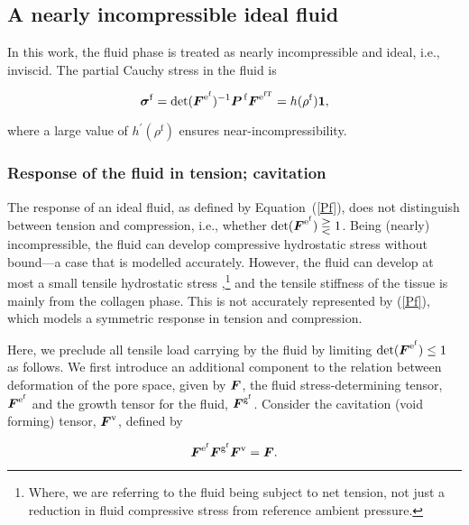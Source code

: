 \subsection{A nearly incompressible ideal fluid}
\label{ideal-incompressible-fluid}

In this work, the fluid phase is treated as nearly incompressible and
ideal, i.e., inviscid. The partial Cauchy stress in the fluid is

\begin{equation}
\mbox{\boldmath$\sigma$}^\mathrm{f} = \mathrm{det}(\mbox{\boldmath$ F$}^{\mathrm{e}^\mathrm{f}})^{-1}
\mbox{\boldmath$ P$}^{\,\mathrm{f}}\mbox{\boldmath$ F$}^{\mathrm{e}^\mathrm{fT}} =
h(\rho^\mathrm{f}){\bf 1},\label{Pf}
\end{equation}

\noindent where a large value of $h^\prime(\rho^\mathrm{f})$ ensures
near-in\-comp\-ress\-i\-bil\-i\-ty.

\subsubsection{Response of the fluid in tension; cavitation}
\label{caviation-under-tension}

The response of an ideal fluid, as defined by \mbox{Equation
  (\ref{Pf})}, does not distinguish between tension and compression,
i.e., whether $\mathrm{det}(\mbox{\boldmath$ F$}^{\mathrm{e}^\mathrm{f}}) \gtreqless
1$. Being (nearly) incompressible, the fluid can develop compressive
hydrostatic stress without bound---a case that is modelled
accurately. However, the fluid can develop at most a small tensile
hydrostatic stress \citep{cavitationchris},\footnote{Where, we are
  referring to the fluid being subject to net tension, not just a
  reduction in fluid compressive stress from reference ambient
  pressure.} and the tensile stiffness of the tissue is mainly from
the collagen phase. This is not accurately represented by (\ref{Pf}),
which models a symmetric response in tension and compression.

Here, we preclude all tensile load carrying by the fluid by limiting
\mbox{$\mathrm{det}(\mbox{\boldmath$ F$}^{\mathrm{e}^\mathrm{f}}) \leq 1$} as
follows. We first introduce an additional component to the relation
between deformation of the pore space, given by $\mbox{\boldmath$ F$}$, the fluid
stress-determining tensor, $\mbox{\boldmath$ F$}^{\mathrm{e}^\mathrm{f}}$ and the
growth tensor for the fluid, $\mbox{\boldmath$ F$}^{\mathrm{g}^\mathrm{f}}$. Consider
the cavitation (void forming) tensor, $\mbox{\boldmath$ F$}^{\mathrm{v}}$, defined by
  
\begin{equation}
 \mbox{\boldmath$ F$}^{\mathrm{e}^\mathrm{f}}\mbox{\boldmath$ F$}^{\mathrm{g}^\mathrm{f}}
 \mbox{\boldmath$ F$}^{\mathrm{v}} = \mbox{\boldmath$ F$}.
\label{fvoid}
\end{equation}

